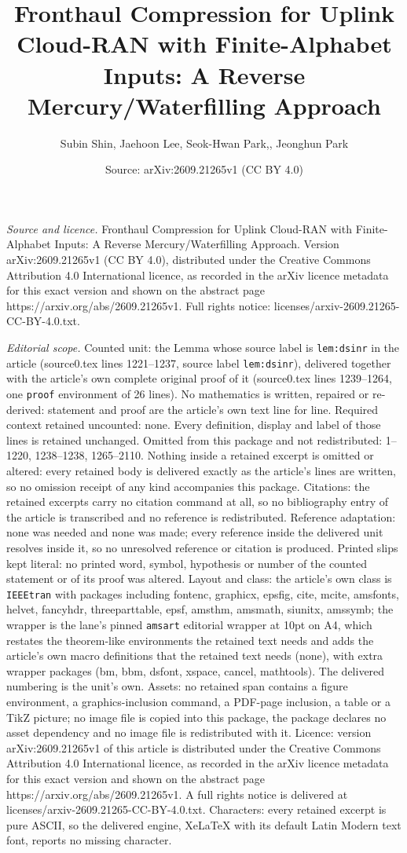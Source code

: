 \documentclass[10pt,a4paper]{amsart}
\title[Fronthaul Compression for Uplink Cloud-RAN with Finite-Alpha]{Fronthaul Compression for Uplink Cloud-RAN with Finite-Alphabet Inputs: A Reverse Mercury/Waterfilling Approach}
\author{Subin Shin, Jaehoon Lee, Seok-Hwan Park,, Jeonghun Park}
\date{Source: arXiv:2609.21265v1 (CC BY 4.0)}
\begin{document}
\maketitle

\noindent\emph{Source and licence.} Fronthaul Compression for Uplink Cloud-RAN with Finite-Alphabet Inputs: A Reverse Mercury/Waterfilling Approach. Version arXiv:2609.21265v1 (CC BY 4.0), distributed under the Creative Commons Attribution 4.0 International licence, as recorded in the arXiv licence metadata for this exact version and shown on the abstract page https://arxiv.org/abs/2609.21265v1. Full rights notice: licenses/arxiv-2609.21265-CC-BY-4.0.txt.\par\smallskip

\noindent\textit{Editorial scope.} Counted unit: the Lemma whose source label is \texttt{lem:dsinr} in the article (source0.tex lines 1221--1237, source label \texttt{lem:dsinr}), delivered together with the article's own complete original proof of it (source0.tex lines 1239--1264, one \texttt{proof} environment of 26 lines). No mathematics is written, repaired or re-derived: statement and proof are the article's own text line for line. Required context retained uncounted: none. Every definition, display and label of those lines is retained unchanged. Omitted from this package and not redistributed: 1--1220, 1238--1238, 1265--2110. Nothing inside a retained excerpt is omitted or altered: every retained body is delivered exactly as the article's lines are written, so no omission receipt of any kind accompanies this package. Citations: the retained excerpts carry no citation command at all, so no bibliography entry of the article is transcribed and no reference is redistributed. Reference adaptation: none was needed and none was made; every reference inside the delivered unit resolves inside it, so no unresolved reference or citation is produced. Printed slips kept literal: no printed word, symbol, hypothesis or number of the counted statement or of its proof was altered. Layout and class: the article's own class is \texttt{IEEEtran} with packages including fontenc, graphicx, epsfig, cite, mcite, amsfonts, helvet, fancyhdr, threeparttable, epsf, amsthm, amsmath, siunitx, amssymb; the wrapper is the lane's pinned \texttt{amsart} editorial wrapper at 10pt on A4, which restates the theorem-like environments the retained text needs and adds the article's own macro definitions that the retained text needs (none), with extra wrapper packages (bm, bbm, dsfont, xspace, cancel, mathtools). The delivered numbering is the unit's own. Assets: no retained span contains a figure environment, a graphics-inclusion command, a PDF-page inclusion, a table or a TikZ picture; no image file is copied into this package, the package declares no asset dependency and no image file is redistributed with it. Licence: version arXiv:2609.21265v1 of this article is distributed under the Creative Commons Attribution 4.0 International licence, as recorded in the arXiv licence metadata for this exact version and shown on the abstract page https://arxiv.org/abs/2609.21265v1. A full rights notice is delivered at licenses/arxiv-2609.21265-CC-BY-4.0.txt. Characters: every retained excerpt is pure ASCII, so the delivered engine, XeLaTeX with its default Latin Modern text font, reports no missing character.
\end{document}
